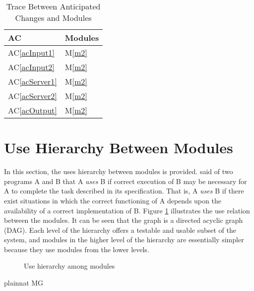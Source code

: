 \documentclass[12pt, titlepage]{article}
\newcommand{\acref}[1]{AC\ref{#1}}
\newcommand{\mref}[1]{M\ref{#1}}
\begin{document}
\begin{table}[H]
    \centering
    \begin{tabular}{p{} p{}}
        \toprule
        \textbf{AC} & \textbf{Modules}\\
        \midrule
        \acref{acInput1} & \mref{m2}\\
        \acref{acInput2} & \mref{m2}\\
        \acref{acServer1} & \mref{m2}\\
        \acref{acServer2} & \mref{m2}\\
        \acref{acOutput} & \mref{m2}\\
        \bottomrule
    \end{tabular}
    \caption{Trace Between Anticipated Changes and Modules}
    \label{TblACT}
\end{table}

\section{Use Hierarchy Between Modules} \label{SecUse}

In this section, the uses hierarchy between modules is provided. \citet{Parnas1978} said of two programs A and B that A {\em uses} B if correct execution of B may be necessary for A to complete the task described in its specification. That is, A {\em uses} B if there exist situations in which the correct functioning of A depends upon the availability of a correct implementation of B.  Figure \ref{FigUH} illustrates the use relation between the modules. It can be seen that the graph is a directed acyclic graph (DAG). Each level of the hierarchy offers a testable and usable subset of the system, and modules in the higher level of the hierarchy are essentially simpler because they use modules from the lower levels.

\begin{figure}[H]
    \centering
    \caption{Use hierarchy among modules}
    \label{FigUH}
\end{figure}


 {plainnat}
 {MG}
\end{document}
